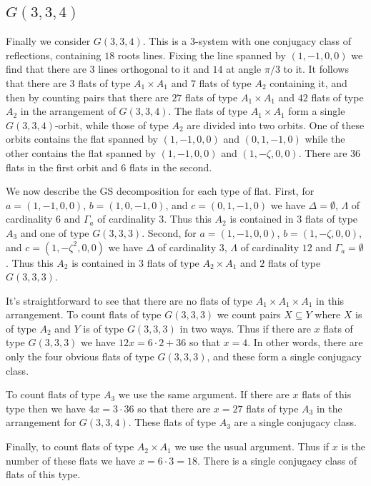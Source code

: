 \documentclass[11pt, reqno]{amsart}
\numberwithin{equation}{section}
\theoremstyle{definition}
\theoremstyle{plain}
\begin{document}
\subsection{$G(3,3,4)$} Finally we consider $G(3,3,4)$. This is a $3$-system with one conjugacy class of reflections, containing $18$ roots lines. Fixing the line spanned by $(1,-1,0,0)$ we find that there are $3$ lines orthogonal to it and $14$ at angle $\pi/3$ to it. It follows that there are $3$ flats of type $A_1 \times A_1$ and $7$ flats of type $A_2$ containing it, and then by counting pairs that there are $27$ flats of type $A_1 \times A_1$ and $42$ flats of type $A_2$ in the arrangement of $G(3,3,4)$. The flats of type $A_1 \times A_1$ form a single $G(3,3,4)$-orbit, while those of type $A_2$ are divided into two orbits. One of these orbits contains the flat spanned by $(1,-1,0,0)$ and $(0,1,-1,0)$ while the other contains the flat spanned by $(1,-1,0,0)$ and $(1,-\zeta,0,0)$. There are $36$ flats in the first orbit and $6$ flats in the second.

We now describe the GS decomposition for each type of flat. First, for $a=(1,-1,0,0)$, $b=(1,0,-1,0)$, and $c=(0,1,-1,0)$ we have $\Delta=\emptyset$, $\Lambda$ of cardinality $6$ and $\Gamma_a$ of cardinality $3$. Thus this $A_2$ is contained in $3$ flats of type $A_3$ and one of type $G(3,3,3)$. Second, for $a=(1,-1,0,0)$, $b=(1,-\zeta,0,0)$, and $c=(1,-\zeta^2,0,0)$ we have $\Delta$ of cardinality $3$, $\Lambda$ of cardinality $12$ and $\Gamma_a=\emptyset$. Thus this $A_2$ is contained in $3$ flats of type $A_2 \times A_1$ and $2$ flats of type $G(3,3,3)$. 

It's straightforward to see that there are no flats of type $A_1 \times A_1 \times A_1$ in this arrangement. To count flats of type $G(3,3,3)$ we count pairs $X \subseteq Y$ where $X$ is of type $A_2$ and $Y$ is of type $G(3,3,3)$ in two ways. Thus if there are $x$ flats of type $G(3,3,3)$ we have $12 x=6 \cdot 2+36$ so that $x=4$. In other words, there are only the four obvious flats of type $G(3,3,3)$, and these form a single conjugacy class. 

To count flats of type $A_3$ we use the same argument. If there are $x$ flats of this type then we have $4x=3 \cdot 36$ so that there are $x=27$ flats of type $A_3$ in the arrangement for $G(3,3,4)$. These flats of type $A_3$ are a single conjugacy class.

Finally, to count flats of type $A_2 \times A_1$ we use the usual argument. Thus if $x$ is the number of these flats we have $x=6\cdot 3=18$. There is a single conjugacy class of flats of this type.
\end{document}
